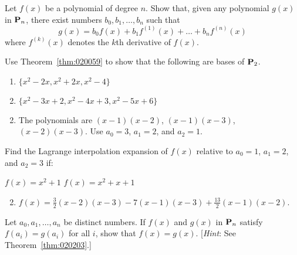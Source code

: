 \begin{multicols}{2}
\begin{ex} \label{ex:6_5_5}
Let $f(x)$ be a polynomial of degree $n$. Show that, given any polynomial $g(x)$ in $\textbf{P}_{n}$, there exist numbers $b_{0}, b_{1}, \dots, b_{n}$ such that
\begin{equation*}
g(x) = b_0f(x) + b_1f^{(1)}(x) + \dots + b_nf^{(n)}(x)
\end{equation*}
where $f^{(k)}(x)$ denotes the $k$th derivative of $f(x)$.
\end{ex}

\begin{ex}
Use Theorem~\ref{thm:020059} to show that the following are bases of $\textbf{P}_{2}$.

\begin{enumerate}[label={\alph*.}]
\item $\{x^{2} - 2x, x^{2} + 2x, x^{2} - 4\}$

\item $\{x^{2} - 3x + 2, x^{2} - 4x + 3, x^{2} - 5x + 6\}$

\end{enumerate}
\begin{sol}
\begin{enumerate}[label={\alph*.}]
\setcounter{enumi}{1}
\item  The polynomials are $(x - 1)(x - 2)$, $(x - 1)(x - 3)$, $(x - 2)(x - 3)$. Use $a_{0} = 3$, $a_{1} = 2$, and $a_{2} = 1$.

\end{enumerate}
\end{sol}
\end{ex}

\begin{ex}
Find the Lagrange interpolation expansion of $f(x)$ relative to $a_{0} = 1$, $a_{1} = 2$, and $a_{2} = 3$ if:

\begin{exenumerate}
\exitem $f(x) = x^{2} + 1$
\exitem $f(x) = x^{2} + x + 1$
\end{exenumerate}
\begin{sol}
\begin{enumerate}[label={\alph*.}]
\setcounter{enumi}{1}
\item  $f(x) = \frac{3}{2}(x - 2)(x - 3) - 7(x - 1)(x - 3) + \frac{13}{2}(x - 1)(x - 2)$.

\end{enumerate}
\end{sol}
\end{ex}

\begin{ex}
Let $a_{0}, a_{1}, \dots, a_{n}$ be distinct numbers. If $f(x)$ and $g(x)$ in $\textbf{P}_{n}$ satisfy $f(a_{i}) = g(a_{i})$ for all $i$, show that $f(x) = g(x)$. [\textit{Hint}: See Theorem~\ref{thm:020203}.]
\end{ex}


\end{multicols}

